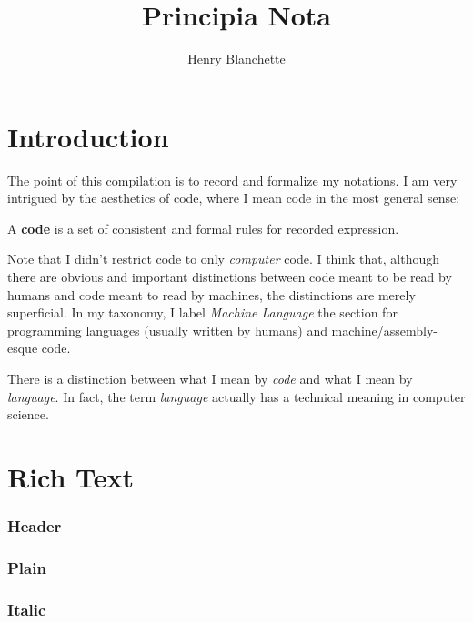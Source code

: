 \documentclass{article}
\title{Principia Nota}
\author{Henry Blanchette}
\date{}
\newcommand{\definition}[1]{
	\vspace{10px}
	\noindent {[\sc Definition]} #1
	\vspace{10px}
}
\begin{document}
\maketitle
\tableofcontents

\newpage

\section{Introduction}

The point of this compilation is to record and formalize my notations. I am very intrigued by the aesthetics of code, where I mean code in the most general sense:

\definition{A \textbf{code} is a set of consistent and formal rules for recorded expression.}

Note that I didn't restrict code to only \textit{computer} code. I think that, although there are obvious and important distinctions between code meant to be read by humans and code meant to read by machines, the distinctions are merely superficial. In my taxonomy, I label \textit{Machine Language} the section for programming languages (usually written by humans) and machine/assembly-esque code.

There is a distinction between what I mean by \textit{code} and what I mean by \textit{language}. In fact, the term \textit{language} actually has a technical meaning in computer science.

\newpage

	
\section{Rich Text}

\subsubsection{Header}
\subsubsection{Plain}
\subsubsection{Italic}
\end{document}

